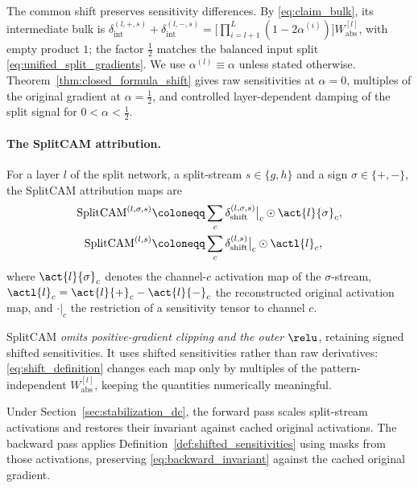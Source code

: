 The common shift preserves sensitivity differences. By \eqref{eq:claim_bulk}, its intermediate bulk is $\delta_{\mathrm{int}}^{(l,+,s)}+\delta_{\mathrm{int}}^{(l,-,s)}=\bigl[\prod_{i=l+1}^L(1-2\alpha^{(i)})\bigr]W_{\mathrm{abs}}^{[l]}$, with empty product $1$; the factor $\tfrac12$ matches the balanced input split \eqref{eq:unified_split_gradients}. We use $\alpha^{(l)}\equiv\alpha$ unless stated otherwise. Theorem~\ref{thm:closed_formula_shift} gives raw sensitivities at $\alpha=0$, multiples of the original gradient at $\alpha=\tfrac12$, and controlled layer-dependent damping of the split signal for $0<\alpha<\tfrac12$.

\paragraph{The SplitCAM attribution.}\label{subsec:splitcam_definition}
\begin{definition}[SplitCAM]\label{def:splitcam}
For a layer $l$ of the split network, a split-stream $s \in \{g, h\}$ and a sign $\sigma \in \{+, -\}$, the SplitCAM attribution maps are
\begin{align}
	\text{SplitCAM}^{(l, \sigma, s)} &\coloneqq \sum_{c} \delta_{\mathrm{shift}}^{(l, \sigma, s)}\big\vert_c \odot \act{l}{\sigma}_c,
	\label{eq:splitcam_stream} \\
	\text{SplitCAM}^{(l, s)} &\coloneqq \sum_{c} \delta_{\mathrm{shift}}^{(l, s)}\big\vert_c \odot \actl{l}_c,
	\label{eq:splitcam_combined}
\end{align}
where $\act{l}{\sigma}_c$ denotes the channel-$c$ activation map of the $\sigma$-stream, $\actl{l}_c = \act{l}{+}_c - \act{l}{-}_c$ the reconstructed original activation map, and $\cdot\vert_c$ the restriction of a sensitivity tensor to channel $c$.
\end{definition}

SplitCAM \emph{omits positive-gradient clipping and the outer $\relu$}, retaining signed shifted sensitivities. It uses shifted sensitivities rather than raw derivatives: \eqref{eq:shift_definition} changes each map only by multiples of the pattern-independent $W_{\mathrm{abs}}^{[l]}$, keeping the quantities numerically meaningful.

Under Section~\ref{sec:stabilization_dc}, the forward pass scales split-stream activations and restores their invariant against cached original activations. The backward pass applies Definition~\ref{def:shifted_sensitivities} using masks from those activations, preserving \eqref{eq:backward_invariant} against the cached original gradient.

